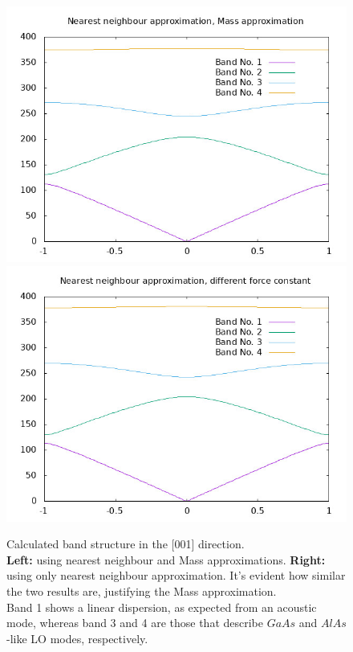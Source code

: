 \documentclass{article}
\begin{document}
\begin{figure}[ht]
	\centering
	\includegraphics[scale=0.3]{same.jpeg}
	\includegraphics[scale=0.3]{different.jpeg}
	\caption{Calculated band structure in the [001] direction.\\ \textbf{Left:} using nearest neighbour and Mass approximations. \textbf{Right:} using only nearest neighbour approximation. It's evident how similar the two results are, justifying the Mass approximation.\\
	Band 1 shows a linear dispersion, as expected from an acoustic mode, whereas band 3 and 4 are those that describe $GaAs$ and $AlAs$-like LO modes, respectively.}
	\label{fig:nearest}
\end{figure}
\end{document}
